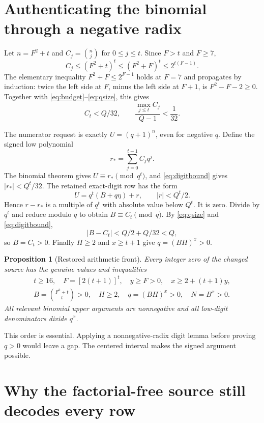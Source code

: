 \documentclass[11pt]{article}
\newtheorem{proposition}[theorem]{Proposition}
\theoremstyle{remark}\newtheorem{remark}[theorem]{Remark}
\begin{document}
\section{Authenticating the binomial through a negative radix}

Let $n=F^2+t$ and $C_j=\binom nj$ for $0\le j\le t$.
Since $F>t$ and $F\ge7$,
\[
 C_j\le(F^2+t)^t\le(F^2+F)^t\le2^{t(F-1)}.
\]
The elementary inequality $F^2+F\le2^{F-1}$ holds at $F=7$
and propagates by induction: twice the left side at $F$, minus the
left side at $F+1$, is $F^2-F-2\ge0$.
Together with \eqref{eq:budget}--\eqref{eq:qsize}, this gives
\begin{equation}\label{eq:digitbound}
 C_t<Q/32,
 \qquad \frac{\max_{j\le t}C_j}{Q-1}<\frac1{32}.
\end{equation}

The numerator request is exactly $U=(q+1)^n$, even for negative $q$.
Define the signed low polynomial
\[
 r_* =\sum_{j=0}^{t-1}C_jq^j.
\]
The binomial theorem gives $U\equiv r_*\pmod{q^t}$, and
\eqref{eq:digitbound} gives $|r_*|<Q^t/32$.
The retained exact-digit row has the form
\[
 U=q^t(B+q\eta)+r,\qquad |r|<Q^t/2.
\]
Hence $r-r_*$ is a multiple of $q^t$ with absolute value below $Q^t$.
It is zero. Divide by $q^t$ and reduce modulo $q$ to obtain
$B\equiv C_t\pmod q$. By \eqref{eq:qsize} and \eqref{eq:digitbound},
\[
 |B-C_t|<Q/2+Q/32<Q,
\]
so $B=C_t>0$. Finally $H\ge2$ and $x\ge t+1$ give
$q=(BH)^x>0$.

\begin{proposition}[Restored arithmetic front]\label{prop:front}
Every integer zero of the changed source has the genuine values and
inequalities
\[
 \begin{gathered}
 t\ge16,\quad F=[2(t+1)]^t,\quad y\ge F>0,\quad
 x\ge2+(t+1)y,\\
 B=\binom{F^2+t}{t}>0,\quad H\ge2,\quad
 q=(BH)^x>0,\quad N=B^x>0.
 \end{gathered}
\]
All relevant binomial upper arguments are nonnegative and all low-digit
denominators divide $q^x$.
\end{proposition}

This order is essential. Applying a nonnegative-radix digit lemma before
proving $q>0$ would leave a gap. The centered interval makes the signed
argument possible.

\section{Why the factorial-free source still decodes every row}
\end{document}

